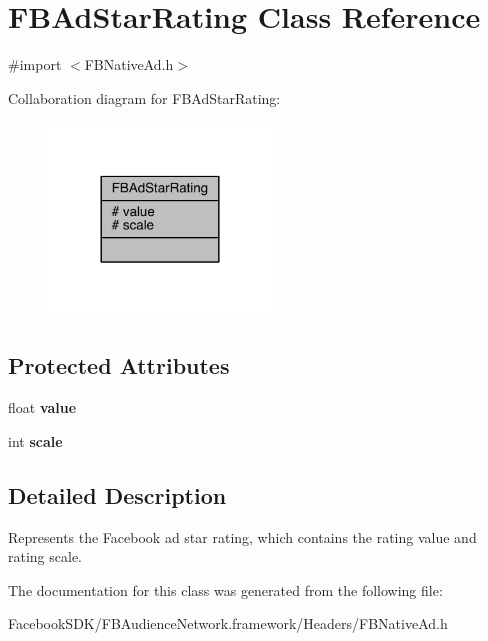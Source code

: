 \hypertarget{struct_f_b_ad_star_rating}{\section{F\-B\-Ad\-Star\-Rating Class Reference}
\label{struct_f_b_ad_star_rating}
}


{\ttfamily \#import $<$F\-B\-Native\-Ad.\-h$>$}



Collaboration diagram for F\-B\-Ad\-Star\-Rating\-:
\nopagebreak
\begin{figure}[H]
\begin{center}
\leavevmode
\includegraphics[width=168pt]{struct_f_b_ad_star_rating__coll__graph}
\end{center}
\end{figure}
\subsection*{Protected Attributes}
\begin{DoxyCompactItemize}
\item 
\hypertarget{struct_f_b_ad_star_rating_a503b6a953a23bd8b8b342453b294ba6c}{float {\bfseries value}}\label{struct_f_b_ad_star_rating_a503b6a953a23bd8b8b342453b294ba6c}

\item 
\hypertarget{struct_f_b_ad_star_rating_a721bb7032bf376b5fd3712e4eb86b625}{int {\bfseries scale}}\label{struct_f_b_ad_star_rating_a721bb7032bf376b5fd3712e4eb86b625}

\end{DoxyCompactItemize}


\subsection{Detailed Description}
Represents the Facebook ad star rating, which contains the rating value and rating scale. 

The documentation for this class was generated from the following file\-:\begin{DoxyCompactItemize}
\item 
Facebook\-S\-D\-K/\-F\-B\-Audience\-Network.\-framework/\-Headers/F\-B\-Native\-Ad.\-h\end{DoxyCompactItemize}
